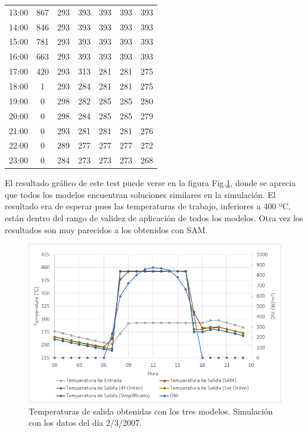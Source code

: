 \begin{table}[H]
{\begin{tabular}{ccccccc}
13:00 & 867 & 293 & 393 & 393 & 393 & 393 \\
14:00 & 846 & 293 & 393 & 393 & 393 & 393 \\
15:00 & 781 & 293 & 393 & 393 & 393 & 393 \\
16:00 & 663 & 293 & 393 & 393 & 393 & 393 \\
17:00 & 420 & 293 & 313 & 281 & 281 & 275 \\
18:00 & 1   & 293 & 284 & 281 & 281 & 275 \\
19:00 & 0   & 298 & 282 & 285 & 285 & 280 \\
20:00 & 0   & 298 & 284 & 285 & 285 & 279 \\
21:00 & 0   & 293 & 281 & 281 & 281 & 276 \\
22:00 & 0   & 289 & 277 & 277 & 277 & 272 \\
23:00 & 0   & 284 & 273 & 273 & 273 & 268
\end{tabular}%
}
\end{table}

El resultado gráfico de este test puede verse en la figura Fig.\ref{fig:temperaturas_modelos}, donde se aprecia que todos los modelos encuentran soluciones similares en la simulación. El resultado era de esperar pues las temperaturas de trabajo, inferiores a 400 ºC, están dentro del rango de validez de aplicación de todos los modelos. Otra vez los resultados son muy parecidos a los obtenidos con SAM.

\begin{figure}[H]
\includegraphics[width=0.9\linewidth]{images/temperaturas_modelos.png}
\caption[Temperaturas de salida obtenidas con los tres modelos]{Temperaturas de salida obtenidas con los tres modelos. Simulación con los datos del día 2/3/2007.} 
\label{fig:temperaturas_modelos}
\end{figure}

